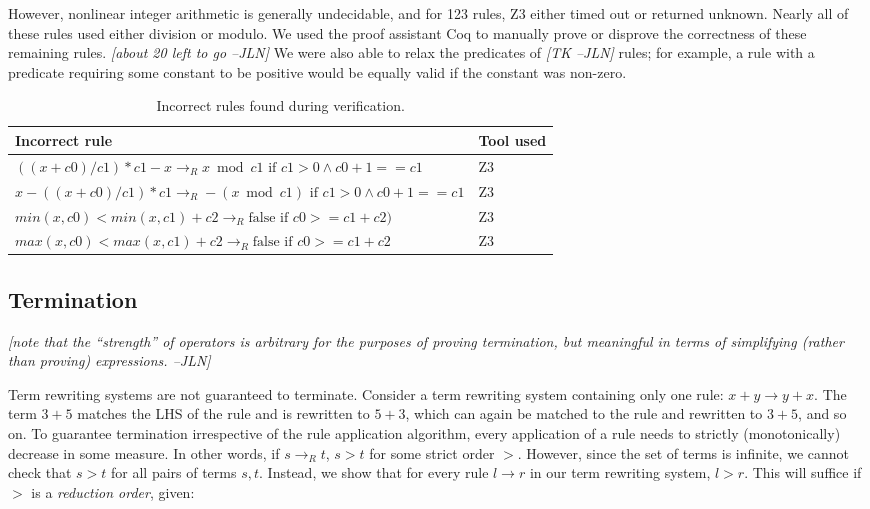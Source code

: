 \documentclass[sigplan,review,anonymous]{acmart}\settopmatter{printfolios=true,printccs=false,printacmref=false}
\newcommand{\jln}[1]{\textcolor{uwpurple}{\textit{[{#1} --JLN]}}}
\begin{document}
However, nonlinear integer arithmetic is generally undecidable, and for 123 rules, Z3 either timed out or returned unknown. Nearly all of these rules used either division or modulo. We used the proof assistant Coq to manually prove or disprove the correctness of these remaining rules. \jln{about 20 left to go} We were also able to relax the predicates of \jln{TK} rules; for example, a rule with a predicate requiring some constant to be positive would be equally valid if the constant was non-zero.

\begin{table*}

\caption{Incorrect rules found during verification.}
\begin{tabular}{|l|l|}
\hline
Incorrect rule & Tool used \\
\hline
$((x + c0)/c1)*c1 - x \rightarrow_R x \bmod c1 \textrm{ if } c1 > 0 \wedge c0 + 1 == c1$ & Z3 \\
$x - ((x + c0)/c1)*c1 \rightarrow_R -(x \bmod c1) \textrm{ if } c1 > 0 \wedge c0 + 1 == c1$ & Z3 \\
$min(x, c0) < min(x, c1) + c2 \rightarrow_R \textrm{false if } c0 >= c1 + c2)$ & Z3 \\
$max(x, c0) < max(x, c1) + c2 \rightarrow_R \textrm{false if } c0 >= c1 + c2$ & Z3 \\
\hline
\end{tabular}
\label{tab:incorrectrules}
\end{table*}

\subsection{Termination}

\jln{note that the ``strength'' of operators is arbitrary for the purposes of proving termination, but meaningful in terms of simplifying (rather than proving) expressions.}

Term rewriting systems are not guaranteed to terminate. Consider a term rewriting system containing only one rule: $x + y \rightarrow y + x$. The term $3 + 5$ matches the LHS of the rule and is rewritten to $5 + 3$, which can again be matched to the rule and rewritten to $3 + 5$, and so on. To guarantee termination irrespective of the rule application algorithm, every application of a rule needs to strictly (monotonically) decrease in some measure. In other words, if $s \rightarrow_R t$, $s > t$ for some strict order $>$. However, since the set of terms is infinite, we cannot check that $s > t$ for all pairs of terms $s, t$. Instead, we show that for every rule $l \rightarrow r$ in our term rewriting system, $l > r$. This will suffice if $>$ is a \emph{reduction order}, given:
\end{document}
